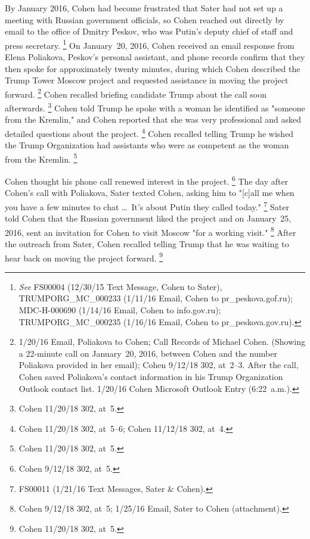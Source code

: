 By January 2016, Cohen had become frustrated that Sater had not set up a meeting with Russian government officials, so Cohen reached out directly by email to the office of Dmitry Peskov, who was Putin's deputy chief of staff and press secretary.%
\footnote{\textit{See} FS00004 (12/30/15 Text Message, Cohen to Sater), TRUMPORG\_MC\_000233 (1/11/16 Email, Cohen to pr\_peskova\@prpress.gof.ru);
MDC-H-000690 (1/14/16 Email, Cohen to info\@prpress.gov.ru);
TRUMPORG\_MC\_000235 (1/16/16 Email, Cohen to pr\_peskova\@prpress.gov.ru).}
On January~20, 2016, Cohen received an email response from Elena Poliakova, Peskov's personal assistant, and phone records confirm that they then spoke for approximately twenty minutes, during which Cohen described the Trump Tower Moscow project and requested assistance in moving the project forward.%
\footnote{1/20/16 Email, Poliakova to Cohen;
Call Records of Michael Cohen.
(Showing a 22-minute call on January~20, 2016, between Cohen and the number Poliakova provided in her email);
Cohen 9/12/18 302, at~2--3.
After the call, Cohen saved Poliakova's contact information in his Trump Organization Outlook contact list.
1/20/16 Cohen Microsoft Outlook Entry (6:22~a.m.).}
Cohen recalled briefing candidate Trump about the call soon afterwards.%
\footnote{Cohen 11/20/18 302, at~5.}
Cohen told Trump he spoke with a woman he identified as "someone from the Kremlin," and Cohen reported that she was very professional and asked detailed questions about the project.%
\footnote{Cohen 11/20/18 302, at~5--6;
Cohen 11/12/18 302, at~4.}
Cohen recalled telling Trump he wished the Trump Organization had assistants who were as competent as the woman from the Kremlin.%
\footnote{Cohen 11/20/18 302, at~5.}

Cohen thought his phone call renewed interest in the project.%
\footnote{Cohen 9/12/18 302, at~5.}
The day after Cohen's call with Poliakova, Sater texted Cohen, asking him to "[c]all me when you have a few minutes to chat \dots\ It's about Putin they called today."%
\footnote{FS00011 (1/21/16 Text Messages, Sater \& Cohen).}
Sater told Cohen that the Russian government liked the project and on January~25, 2016, sent an invitation for Cohen to visit Moscow "for a working visit."%
\footnote{Cohen 9/12/18 302, at~5;
1/25/16 Email, Sater to Cohen (attachment).}
After the outreach from Sater, Cohen recalled telling Trump that he was waiting to hear back on moving the project forward.%
\footnote{Cohen 11/20/18 302, at~5.}

